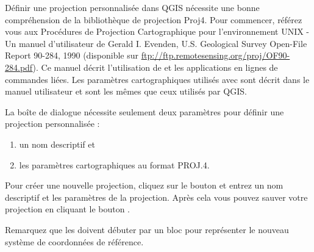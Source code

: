 Définir une projection personnalisée dans QGIS nécessite une bonne
compréhension de la bibliothèque de projection Proj4. Pour commencer, référez
vous aux Procédures de Projection Cartographique pour l'environnement UNIX - Un
manuel d'utilisateur de Gerald I. Evenden, U.S. Geological Survey Open-File
Report 90-284, 1990 (disponible sur
\url{ftp://ftp.remotesensing.org/proj/OF90-284.pdf}).
Ce manuel décrit l'utilisation de  et les applications en
lignes de commandes liées. Les paramètres cartographiques utilisés avec
 sont décrit dans le manuel utilisateur et sont les mêmes que
ceux utilisés par QGIS.

La boîte de dialogue  nécessite seulement deux paramètres pour définir une
projection personnalisée :
\begin{enumerate}
\item un nom descriptif et
\item les paramètres cartographiques au format PROJ.4.
\end{enumerate}
Pour créer une nouvelle projection, cliquez sur le bouton
 et entrez un nom descriptif et les paramètres de
la projection. Après cela vous pouvez sauver votre projection en cliquant le
bouton  .

Remarquez que les  doivent débuter par un
 bloc  pour représenter le nouveau système de coordonnées de
référence.

